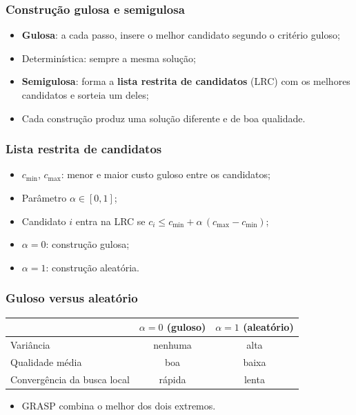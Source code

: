 \documentclass[fleqn]{beamer}
\begin{document}
\begin{frame}
	\frametitle{Construção gulosa e semigulosa}
	\begin{itemize}
		\item \textbf{Gulosa}: a cada passo, insere o melhor candidato
			segundo o critério guloso;
		\item Determinística: sempre a mesma solução;
		\item \textbf{Semigulosa}: forma a \textbf{lista restrita de
			candidatos} (LRC) com os melhores candidatos e sorteia um
			deles;
		\item Cada construção produz uma solução diferente e de boa
			qualidade.
	\end{itemize}
\end{frame}

\begin{frame}
	\frametitle{Lista restrita de candidatos}
	\begin{itemize}
		\item $c_{\min}$, $c_{\max}$: menor e maior custo guloso entre os
			candidatos;
		\item Parâmetro $\alpha \in [0,1]$;
		\item Candidato $i$ entra na LRC se $c_i \leq c_{\min} +
			\alpha\,(c_{\max} - c_{\min})$;
		\item $\alpha = 0$: construção gulosa;
		\item $\alpha = 1$: construção aleatória.
	\end{itemize}
\end{frame}

\begin{frame}
	\frametitle{Guloso versus aleatório}
	\begin{center}
	\begin{tabular}{lcc}
		\toprule
		& $\alpha = 0$ (guloso) & $\alpha = 1$ (aleatório) \\
		\midrule
		Variância & nenhuma & alta \\
		Qualidade média & boa & baixa \\
		Convergência da busca local & rápida & lenta \\
		\bottomrule
	\end{tabular}
	\end{center}
	\begin{itemize}
		\item GRASP combina o melhor dos dois extremos.
	\end{itemize}
\end{frame}
\end{document}
